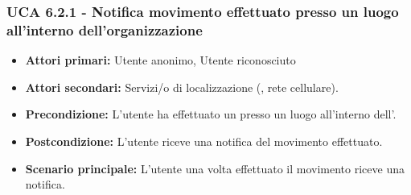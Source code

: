 \subsubsection{UCA 6.2.1 - Notifica movimento effettuato presso un luogo all'interno dell'organizzazione}
\begin{itemize}
	\item \textbf{Attori primari:} Utente anonimo, Utente riconosciuto
	\item \textbf{Attori secondari:} Servizi/o di localizzazione (, rete cellulare).
	\item \textbf{Precondizione:} L'utente ha effettuato un  presso un luogo all'interno dell'.
	\item \textbf{Postcondizione:} L'utente riceve una notifica del movimento effettuato.
	\item \textbf{Scenario principale:} L'utente una volta effettuato il movimento riceve una notifica.
\end{itemize}















